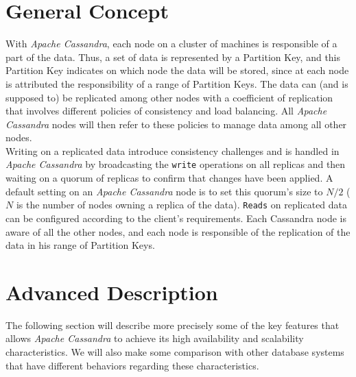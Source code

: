 \documentclass[a4paper]{report}
\newcommand{\ca}{\emph{Apache Cassandra\xspace}}
\begin{document}
\section{General Concept}
With \ca{}, each node on a cluster of machines is responsible of a part of the data. Thus, a set of data is represented by a Partition Key, and this Partition Key indicates on which node the data will be stored, since at each node is attributed the responsibility of a range of Partition Keys. The data can (and is supposed to) be replicated among other nodes with a coefficient of replication that involves different policies of consistency and load balancing. All \ca{} nodes will then refer to these policies to manage data among all other nodes.\\
Writing on a replicated data introduce consistency challenges and is handled in \ca{} by broadcasting the \verb;write; operations on all replicas and then waiting on a quorum of replicas to confirm that changes have been applied. A default setting on an \ca{} node is to set this quorum's size to $N/2$ ($N$ is the number of nodes owning a replica of the data). \verb;Reads; on replicated data can be configured according to the client's requirements. Each Cassandra node is aware of all the other nodes, and each node is responsible of the replication of the data in his range of Partition Keys.

\section{Advanced Description}
The following section will describe more precisely some of the key features that allows \ca{} to achieve its high availability and scalability characteristics. We will also make some comparison with other database systems that have different behaviors regarding these characteristics.
\end{document}
